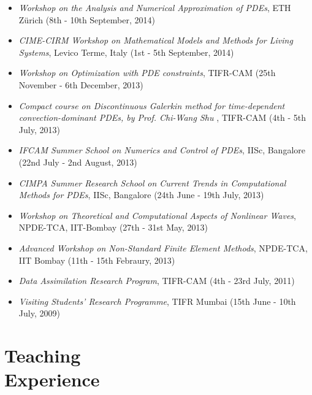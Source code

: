 \documentclass[margin]{res}
\begin{document}
\begin{resume}
\begin{itemize}
              \item{\it Workshop on the Analysis and Numerical Approximation of PDEs}, ETH Z\"{u}rich (8th - 10th September, 2014)
               
               \item{\it CIME-CIRM Workshop on Mathematical Models and Methods for Living Systems}, Levico Terme, Italy (1st - 5th September, 2014)

              \item{\it Workshop on Optimization with PDE constraints}, TIFR-CAM (25th November - 6th December, 2013)
   
               \item{\it Compact course on Discontinuous Galerkin method for time-dependent convection-dominant PDEs, by Prof. Chi-Wang Shu }, TIFR-CAM (4th - 5th July, 2013)
               
               
               \item{\it IFCAM Summer School on Numerics and Control of PDEs}, IISc, Bangalore (22nd July - 2nd August, 2013)
               
               \item{\it CIMPA Summer Research School on Current Trends in Computational Methods for PDEs}, IISc, Bangalore (24th June - 19th July, 2013)
               
               \item{\it Workshop on Theoretical and Computational Aspects of Nonlinear Waves}, \\NPDE-TCA, IIT-Bombay (27th - 31st May, 2013)

               \item{\it Advanced Workshop on Non-Standard Finite Element Methods}, NPDE-TCA, \\IIT Bombay (11th - 15th Febraury, 2013)

               \item{\it Data Assimilation Research Program}, TIFR-CAM (4th - 23rd July, 2011)

               \item{\it Visiting Students' Research Programme}, TIFR Mumbai (15th June - 10th July, 2009)
               \end{itemize}          
            
              
\section{Teaching \\Experience} 
   

\end{resume}
\end{document}
